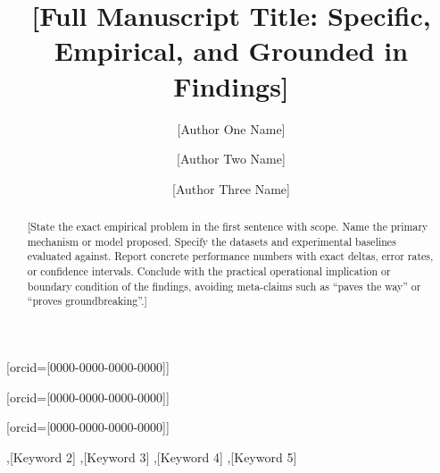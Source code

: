 \documentclass[a4paper,fleqn]{cas-sc}
\begin{document}
\let\WriteBookmarks\relax

\shortauthors{[FirstAuthor et~al.]}

\title [mode = title]{[Full Manuscript Title: Specific, Empirical, and Grounded in Findings]}

\author[1]{[Author One Name]}[orcid=[0000-0000-0000-0000]]
\cormark[1]

\author[1]{[Author Two Name]}[orcid=[0000-0000-0000-0000]]

\author[2]{[Author Three Name]}[orcid=[0000-0000-0000-0000]]




\begin{abstract}
[State the exact empirical problem in the first sentence with scope. Name the primary mechanism or model proposed. Specify the datasets and experimental baselines evaluated against. Report concrete performance numbers with exact deltas, error rates, or confidence intervals. Conclude with the practical operational implication or boundary condition of the findings, avoiding meta-claims such as ``paves the way'' or ``proves groundbreaking''.]
\end{abstract}

\begin{keywords}
[Keyword 1] \sep [Keyword 2] \sep [Keyword 3] \sep [Keyword 4] \sep [Keyword 5]
\end{keywords}
\end{document}
